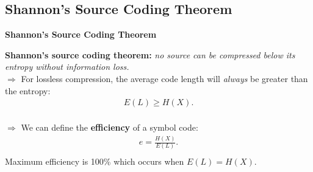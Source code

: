 \documentclass[compress]{beamer}        %
\makeatletter
\newcommand{\tcb}{\textcolor{beamer@blendedblue}}
\makeatother
\begin{document}
\subsection{Shannon's Source Coding Theorem}
\begin{frame}{\bf \tcb{Shannon's Source Coding Theorem}}

{\bf Shannon's source coding theorem:} \emph{no source can be compressed below its entropy without information loss.}\\[0.5cm]

$\Rightarrow$ For lossless compression, the average code length will \emph{always} be greater than the entropy:\\[-0.4cm]
\begin{align*}
\boxed{E(L) \ge H(X)}.\\[-0.0cm]
\end{align*}

$\Rightarrow$ We can define the {\bf efficiency} of a symbol code:\\[-0.1cm]
\begin{align*}
\boxed{e = \frac{H(X)}{E(L)}}.\\[-0.3cm]
\end{align*}
Maximum efficiency is 100\% which occurs when $E(L) = H(X)$.

\end{frame}
\end{document}
